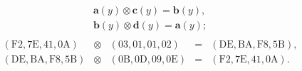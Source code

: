 \[\begin{array}{l}
        \mathbf{a}(y) \otimes \mathbf{c}(y) = \mathbf{b}(y), \\
        \mathbf{b}(y) \otimes \mathbf{d}(y) = \mathbf{a}(y); \\
    \end{array}
\] \[
    \begin{array}{ccccc}
        (\mathrm{F2}, \mathrm{7E}, \mathrm{41}, \mathrm{0A}) & \otimes & (\mathrm{03}, \mathrm{01}, \mathrm{01}, \mathrm{02}) & = & (\mathrm{DE}, \mathrm{BA}, \mathrm{F8}, \mathrm{5B}), \\
        (\mathrm{DE}, \mathrm{BA}, \mathrm{F8}, \mathrm{5B}) & \otimes & (\mathrm{0B}, \mathrm{0D}, \mathrm{09}, \mathrm{0E}) & = & (\mathrm{F2}, \mathrm{7E}, \mathrm{41}, \mathrm{0A}). \\
    \end{array}
\]
\exampleend
